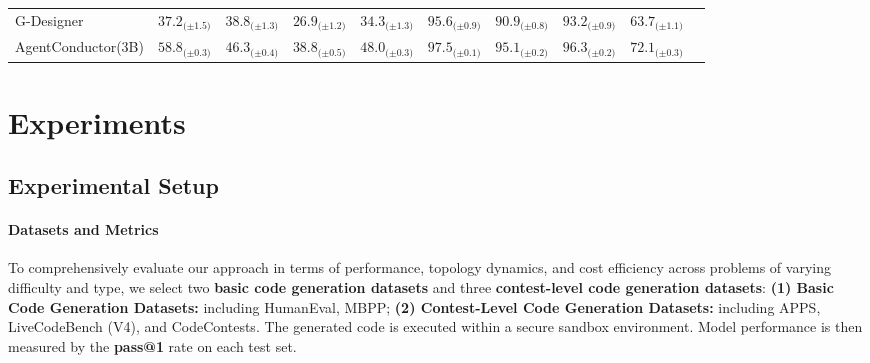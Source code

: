 \documentclass{article}
\theoremstyle{definition}
\begin{document}
\begin{table}[!t]
{\begin{tabular}{p{5cm}*{8}{c}c}
G-Designer 
& $37.2_{\text{(±1.5)}}$
& $38.8_{\text{(±1.3)}}$
& $26.9_{\text{(±1.2)}}$
& $34.3_{\text{(±1.3)}}$
& $95.6_{\text{(±0.9)}}$
& $90.9_{\text{(±0.8)}}$
& $93.2_{\text{(±0.9)}}$
& $63.7_{\text{(±1.1)}}$\\

\rowcolor[RGB]{220,235,245}
AgentConductor(3B)  
& $\mathbf{58.8}_{\text{(±0.3)}}$
& $\mathbf{46.3}_{\text{(±0.4)}}$
& $\mathbf{38.8}_{\text{(±0.5)}}$
& $\mathbf{48.0}_{\text{(±0.3)}}$
& $\mathbf{97.5}_{\text{(±0.1)}}$
& $\mathbf{95.1}_{\text{(±0.2)}}$
& $\mathbf{96.3}_{\text{(±0.2)}}$
& $\mathbf{72.1}_{\text{(±0.3)}}$\\

\bottomrule
\end{tabular}}
\vspace{-0.8em}
\end{table}
\section{Experiments}
\label{exps}
\subsection{Experimental Setup}

\paragraph{Datasets and Metrics} 
\label{gragph:dataset_and_metrics}To comprehensively evaluate our approach in terms of performance, topology dynamics, and cost efficiency across problems of varying difficulty and type, we select two \textbf{basic code generation datasets} and three \textbf{contest-level code generation datasets}: \textbf{(1) Basic Code Generation Datasets: } including HumanEval\citep{chen2021evaluating}, MBPP\citep{austin2021program}; \textbf{(2) Contest-Level Code Generation Datasets: } including APPS\citep{hendrycks2021measuring}, LiveCodeBench (V4)\citep{jain2024livecodebench}, and CodeContests\citep{li2022competition}.  The generated code is executed within a secure sandbox \citep{khan2023xcodeeval} environment. Model performance is then measured by the \textbf{pass@1} rate on each test set.
\end{document}

